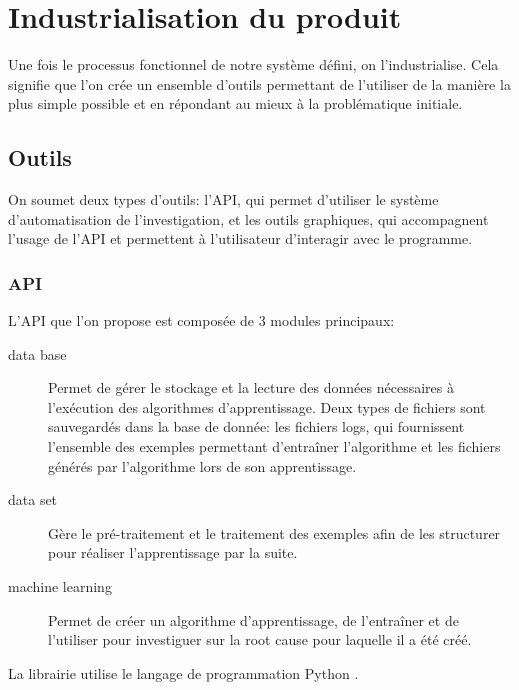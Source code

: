 \chapter{Industrialisation du produit}
\label{Industrialisation du produit}
\thispagestyle{fancy}
Une fois le processus fonctionnel de notre système défini, on l'industrialise. Cela signifie que l'on crée un ensemble d'outils permettant de l'utiliser de la manière la plus simple possible et en répondant au mieux à la problématique initiale. 

\section{Outils}
\label{Industrialisation du produit: Outils}
On soumet deux types d'outils: l'API, qui permet d'utiliser le système d'automatisation de l'investigation, et les outils graphiques, qui accompagnent l'usage de l'API et permettent à l'utilisateur d'interagir avec le programme.  

\subsection{API}
\label{Industrialisation du produit: Outils: API}
L'API que l'on propose est composée de 3 modules principaux:
\begin{description}
	\item [data base] Permet de gérer le stockage et la lecture des données nécessaires à l'exécution des algorithmes d'apprentissage. Deux types de fichiers sont sauvegardés dans la base de donnée: les fichiers logs, qui fournissent l'ensemble des exemples permettant d'entraîner l'algorithme et les fichiers générés par l'algorithme lors de son apprentissage.
	\item [data set] Gère le pré-traitement et le traitement des exemples afin de les structurer pour réaliser l'apprentissage par la suite.
	\item [machine learning] Permet de créer un algorithme d'apprentissage, de l'entraîner et de l'utiliser pour investiguer sur la root cause pour laquelle il a été créé.
\end{description}

La librairie utilise le langage de programmation Python \cite{Python}. \\

